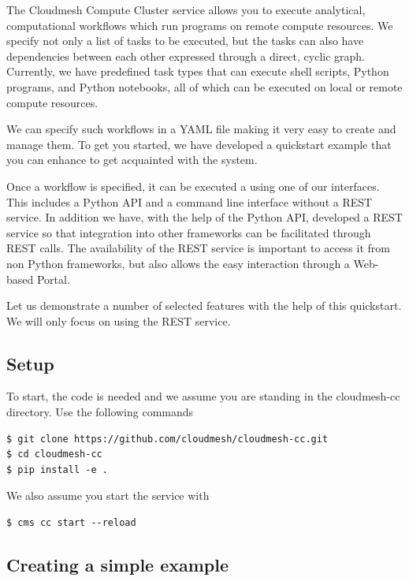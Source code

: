 The Cloudmesh Compute Cluster service allows you to execute analytical,
computational workflows which run programs on remote compute resources.
We specify not only a list of tasks to be executed, but the tasks can
also have dependencies between each other expressed through a direct,
cyclic graph. Currently, we have predefined task types that can execute
shell scripts, Python programs, and Python notebooks, all of which can
be executed on local or remote compute resources.


We can specify such workflows in a YAML file making it very easy to
create and manage them. To get you started, we have developed a
quickstart example that you can enhance to get acquainted with the
system.

Once a workflow is specified, it can be executed a using one of our
interfaces. This includes a Python API and a command line interface
without a REST service. In addition we have, with the help of the Python
API, developed a REST service so that integration into other frameworks
can be facilitated through REST calls. The availability of the REST
service is important to access it from non Python frameworks, but also
allows the easy interaction through a Web-based Portal.

Let us demonstrate a number of selected features with the help of this
quickstart. We will only focus on using the REST service.

\subsection{Setup}\label{setup}

To start, the code is needed and we assume you are standing in the
cloudmesh-cc directory. Use the following commands

\smallskip
\begin{verbatim}
$ git clone https://github.com/cloudmesh/cloudmesh-cc.git
$ cd cloudmesh-cc
$ pip install -e .
\end{verbatim}
\smallskip

We also assume you start the service with

\smallskip
\begin{verbatim}
$ cms cc start --reload
\end{verbatim}
\smallskip

\subsection{Creating a simple example}\label{creating-a-simple-example}

